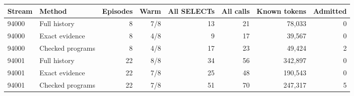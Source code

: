 \begin{tabular}{llrrrrrr}
\toprule
Stream & Method & Episodes & Warm & All SELECTs & All calls & Known tokens & Admitted\\
\midrule
94000 & Full history & 8 & 7/8 & 13 & 21 & 78,033 & 0\\
94000 & Exact evidence & 8 & 4/8 & 9 & 17 & 39,567 & 0\\
94000 & Checked programs & 8 & 4/8 & 17 & 23 & 49,424 & 2\\
94001 & Full history & 22 & 8/8 & 34 & 56 & 342,897 & 0\\
94001 & Exact evidence & 22 & 7/8 & 25 & 48 & 190,543 & 0\\
94001 & Checked programs & 22 & 7/8 & 51 & 70 & 247,317 & 5\\
\bottomrule
\end{tabular}
\par{}
